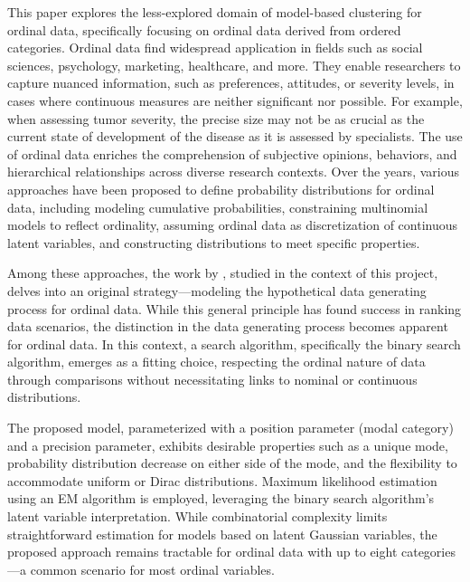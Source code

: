 This paper explores the less-explored domain of model-based clustering for ordinal data, specifically focusing on ordinal data derived from ordered categories. Ordinal data find widespread application in fields such as social sciences, psychology, marketing, healthcare, and more. They enable researchers to capture nuanced information, such as preferences, attitudes, or severity levels, in cases where continuous measures are neither significant nor possible. For example, when assessing tumor severity, the precise size may not be as crucial as the current state of development of the disease as it is assessed by specialists. The use of ordinal data enriches the comprehension of subjective opinions, behaviors, and hierarchical relationships across diverse research contexts. Over the years, various approaches have been proposed to define probability distributions for ordinal data, including modeling cumulative probabilities, constraining multinomial models to reflect ordinality, assuming ordinal data as discretization of continuous latent variables, and constructing distributions to meet specific properties.

Among these approaches, the work by \cite{biernacki2016model}, studied in the context of this project, delves into an original strategy—modeling the hypothetical data generating process for ordinal data. While this general principle has found success in ranking data scenarios, the distinction in the data generating process becomes apparent for ordinal data. In this context, a search algorithm, specifically the binary search algorithm, emerges as a fitting choice, respecting the ordinal nature of data through comparisons without necessitating links to nominal or continuous distributions.

The proposed model, parameterized with a position parameter (modal category) and a precision parameter, exhibits desirable properties such as a unique mode, probability distribution decrease on either side of the mode, and the flexibility to accommodate uniform or Dirac distributions. Maximum likelihood estimation using an EM algorithm is employed, leveraging the binary search algorithm's latent variable interpretation. While combinatorial complexity limits straightforward estimation for models based on latent Gaussian variables, the proposed approach remains tractable for ordinal data with up to eight categories—a common scenario for most ordinal variables.

